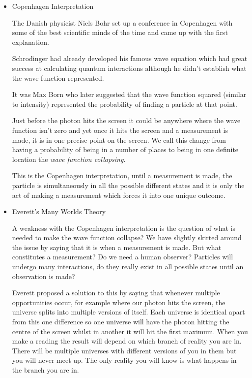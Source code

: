 \documentclass[revision-guide.tex]{subfiles}
\begin{document}
\begin{itemize}
\item 
Copenhagen Interpretation

The Danish physicist Niels Bohr set up a conference in Copenhagen with some of the best scientific minds of the time and came up with the first explanation.

Schrodinger had already developed his famous wave equation which had great success at calculating quantum interactions although he didn't establish what the wave function represented. 

It was Max Born who later suggested that the wave function squared (similar to intensity) represented the probability of finding a particle at that point. 

Just before the photon hits the screen it could be anywhere where the wave function isn't zero and yet once it hits the screen and a measurement is made, it is in one precise point on the screen. We call this change from having a probability of being in a number of places to being in one definite location the \emph{wave function collapsing}.

This is the Copenhagen interpretation, until a measurement is made, the particle is simultaneously in all the possible different states and it is only the act of making a measurement which forces it into one unique outcome. 

\item 

Everett's Many Worlds Theory

A weakness with the Copenhagen interpretation is the question of what is needed to make the wave function collapse? We have slightly skirted around the issue by saying that it is when a measurement is made. But what constitutes a measurement? Do we need a human observer? Particles will undergo many interactions, do they really exist in all possible states until an observation is made?

Everett proposed a solution to this by saying that whenever multiple opportunities occur, for example where our photon hits the screen, the universe splits into multiple versions of itself. Each universe is identical apart from this one difference so one universe will have the photon hitting the centre of the screen whilst in another it will hit the first maximum. When you make a reading the result will depend on which branch of reality you are in. There will be multiple universes with different versions of you in them but you will never meet up. The only reality you will know is what happens in the branch you are in. 


\end{itemize}
\end{document}
